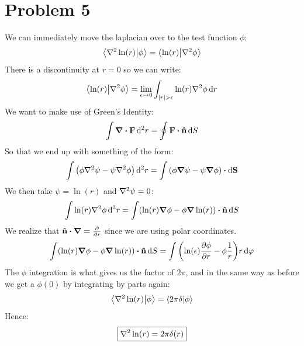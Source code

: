 \documentclass[12pt]{article}
\begin{document}
\section*{Problem 5}
We can immediately move the laplacian over to the test function $\phi$:
\begin{align*}
  \ip{\laplacian{\ln(r)}}{\phi}=\ip{\ln(r)}{\laplacian{\phi}}
\end{align*}
There is a discontinuity at $r=0$ so we can write:
\begin{align*}
  \ip{\ln(r)}{\laplacian{\phi}}=\lim_{\epsilon\to0}
  \int_{\abs{r}>\epsilon}\ln(r)\laplacian{\phi}\dd{r}
\end{align*}
We want to make use of Green's Identity:
\begin{align*}
  \int\div{\vb{F}}\dd[2]{r}=\oint\vb{F}\vdot\vu{n}\dd{S}
\end{align*}
So that we end up with something of the form:
\begin{align*}
  \int\qty(\phi\laplacian{\psi}-\psi\laplacian\phi)\dd[2]{r}=
  \int\qty(\phi\grad{\psi}-\psi\grad{\phi})\vdot\dd{\vb{S}}
\end{align*}
We then take $\psi=\ln(r)$ and $\laplacian{\psi}=0$:
\begin{align*}
  \int\ln(r)\laplacian{\phi}\dd[2]{r}=\int(\ln(r)\grad\phi-\phi\grad{\ln(r)})
  \vdot\vu{n}\dd{S}
\end{align*}
We realize that $\vu{n}\vdot\gradient=\pdv{r}$ since we are using polar coordinates.
\begin{align*}
  \int(\ln(r)\grad\phi-\phi\grad{\ln(r)})\vdot\vu{n}\dd{S}=
  \int\qty(\ln(\epsilon)\pdv{\phi}{r}-\phi\frac{1}{r})
  r\dd{\varphi}
\end{align*}
The $\phi$ integration is what gives us the factor of $2\pi$, and in the same way as before we get a $\phi(0)$ by integrating by parts again:
\begin{align*}
  \ip{\laplacian{\ln(r)}}{\phi}=\ip{2\pi\delta}{\phi}
\end{align*}
Hence:
\begin{align}
  \boxed{
    \laplacian{\ln(r)}=2\pi\delta(r)
  }
\end{align}
\end{document}

